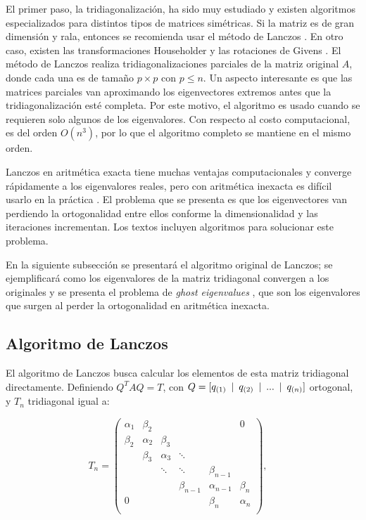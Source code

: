 El primer paso, la tridiagonalización, ha sido muy estudiado y existen algoritmos especializados para distintos tipos de matrices simétricas. Si la matriz es de gran dimensión y rala, entonces se recomienda usar el método de Lanczos \cite{golub2012matrix}. En otro caso, existen las transformaciones Householder y las rotaciones de Givens \cite{golub2012matrix}. El método de Lanczos realiza tridiagonalizaciones parciales de la matriz original $A$, donde cada una es de tamaño $p \times p$ con $p\leq n$. Un aspecto interesante es que las matrices parciales van aproximando los eigenvectores extremos antes que la tridiagonalización esté completa. Por este motivo, el algoritmo es usado cuando se requieren solo algunos de los eigenvalores. Con respecto al costo computacional, es del orden $O(n^3)$, por lo que el algoritmo completo se mantiene en el mismo orden. 

Lanczos en aritmética exacta tiene muchas ventajas computacionales y converge rápidamente a los eigenvalores reales, pero con aritmética inexacta es difícil usarlo en la práctica \cite{golub2012matrix}. El problema que se presenta es que los eigenvectores van perdiendo la ortogonalidad entre ellos conforme la dimensionalidad y las iteraciones incrementan. Los textos \cite{demmel1997applied}\cite{golub2012matrix} incluyen algoritmos para solucionar este problema.

En la siguiente subsección se presentará el algoritmo original de Lanczos; se ejemplificará como los eigenvalores de la matriz tridiagonal convergen a los originales y se presenta el problema de \textit{ghost eigenvalues} \cite{demmel1997applied}, que son los eigenvalores que surgen al perder la ortogonalidad en aritmética inexacta.

\subsection{Algoritmo de Lanczos}

El algoritmo de Lanczos busca calcular los elementos de esta matriz tridiagonal directamente. Definiendo $Q^T A Q = T$, con $Q = [q_{(1)} \enskip|\enskip q_{(2)} \enskip|\enskip ... \enskip|\enskip q_{(n)}]$ ortogonal, y $T_n$ tridiagonal igual a:

\begin{equation}\label{eq:3.2}
T_n = \left(\!
    \begin{array}{cccccc}
      \alpha_1 & \beta_2 &  &  &  & 0\\
      \beta_2  & \alpha_2 & \beta_3 &  &  & \\
               & \beta_3 & \alpha_3 &  \ddots  & & \\
               &         & \ddots & \ddots & \beta_{n-1}& \\
               &  &  &  \beta_{n-1} & \alpha_{n-1} & \beta_n\\
       0       &  &  &  & \beta_n & \alpha_{n}\\
    \end{array}
  \!\right), \quad
\end{equation}

